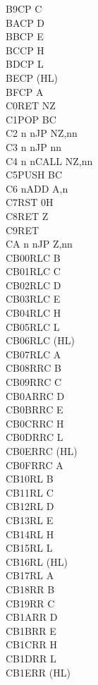 \documentclass[oneside,a4paper]{book}
\begin{document}
\begin{multicols}{3}
{\begin{tabbing}
B9\>CP C\\
BA\>CP D\\
BB\>CP E\\
BC\>CP H\\
BD\>CP L\\
BE\>CP (HL)\\
BF\>CP A\\
C0\>RET NZ\\
C1\>POP BC\\
C2 n n\>JP NZ,nn\\
C3 n n\>JP nn\\
C4 n n\>CALL NZ,nn\\
C5\>PUSH BC\\
C6 n\>ADD A,n\\
C7\>RST 0H\\
C8\>RET Z\\
C9\>RET\\
CA n n\>JP Z,nn\\
CB00\>RLC B\\
CB01\>RLC C\\
CB02\>RLC D\\
CB03\>RLC E\\
CB04\>RLC H\\
CB05\>RLC L\\
CB06\>RLC (HL)\\
CB07\>RLC A\\
CB08\>RRC B\\
CB09\>RRC C\\
CB0A\>RRC D\\
CB0B\>RRC E\\
CB0C\>RRC H\\
CB0D\>RRC L\\
CB0E\>RRC (HL)\\
CB0F\>RRC A\\
CB10\>RL B\\
CB11\>RL C\\
CB12\>RL D\\
CB13\>RL E\\
CB14\>RL H\\
CB15\>RL L\\
CB16\>RL (HL)\\
CB17\>RL A\\
CB18\>RR B\\
CB19\>RR C\\
CB1A\>RR D\\
CB1B\>RR E\\
CB1C\>RR H\\
CB1D\>RR L\\
CB1E\>RR (HL)\\

\end{tabbing}}
\end{multicols}
\end{document}
